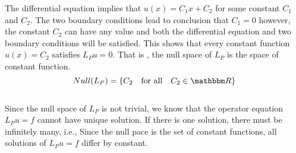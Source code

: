 \begin{solution}
\begin{enumerate}
The differential equation implies that $\displaystyle{u(x)= C_1 x + C_2}$ for some constant $C_1$ and $C_2$. The two boundary conditions lead to conclusion that $C_1=0$ however, the constant $C_2$ can have any value and both the differential equation and two boundary conditions will be satisfied. This shows that every constant function $u(x) = C_2$ satisfies $L_{P} u = 0$. That is , the null space of $L_P$ is the space of constant function.
\[
Null({L_P })= \{C_2 \quad \textrm{for all}\quad C_2 \in \R\}
\]
\\
Since the null space of $L_P$ is not trivial, we know that the operator equation $L_{P} u = f$ cannot have unique solution. If there is one solution, there must be infinitely many, i.e., Since the null pace is the set of constant functions, all solutions of $L_{P} u = f$ differ by constant.

\end{enumerate}
\end{solution}
